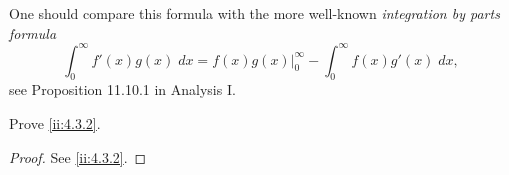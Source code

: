\begin{rmk}\label{ii:4.3.3}
  One should compare this formula with the more well-known \emph{integration by parts formula}
  \[
    \int_0^\infty f'(x) g(x) \; dx = f(x) g(x) |_0^\infty - \int_0^\infty f(x) g'(x) \; dx,
  \]
  see Proposition 11.10.1 in Analysis I.
\end{rmk}

\exercisesection

\begin{ex}\label{ii:ex:4.3.1}
  Prove \cref{ii:4.3.2}.
\end{ex}

\begin{proof}
  See \cref{ii:4.3.2}.
\end{proof}
